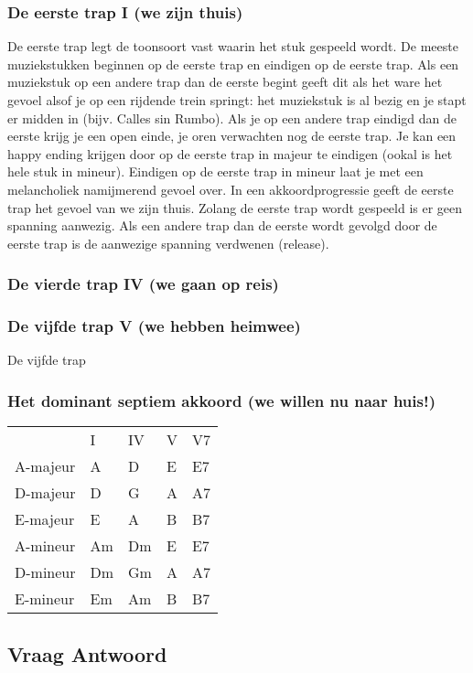 \subsubsection*{De eerste trap I (we zijn thuis)}
De eerste trap legt de toonsoort vast waarin het stuk gespeeld wordt. De meeste muziekstukken beginnen op de eerste trap en eindigen op de eerste trap. Als een muziekstuk op een andere trap dan de eerste begint geeft dit als het ware het gevoel alsof je op een rijdende trein springt: het muziekstuk is al bezig en je stapt er midden in (bijv. Calles sin Rumbo). Als je op een andere trap eindigd dan de eerste krijg je een open einde, je oren verwachten nog de eerste trap. Je kan een happy ending krijgen door op de eerste trap in majeur te eindigen (ookal is het hele stuk in mineur). Eindigen op de eerste trap in mineur laat je met een melancholiek namijmerend gevoel over.
In een akkoordprogressie geeft de eerste trap het gevoel van we zijn thuis. Zolang de eerste trap wordt gespeeld is er geen spanning aanwezig. Als een andere trap dan de eerste wordt gevolgd door de eerste trap is de aanwezige spanning verdwenen (release).
 
\subsubsection*{De vierde trap IV (we gaan op reis)}

\subsubsection*{De vijfde trap V (we hebben heimwee)}
De vijfde trap
\subsubsection*{Het dominant septiem akkoord (we willen nu naar huis!)}

\begin{tabular}{l l l l l}
		 & I & IV & V & V7\\
A-majeur &	A &	D &	E & E7\\
D-majeur &	D &	G &	A & A7\\
E-majeur &	E &	A &	B & B7\\
A-mineur &	Am & Dm & E & E7\\
D-mineur &	Dm & Gm & A	& A7\\
E-mineur &	Em & Am & B	& B7
\end{tabular}

\subsection*{Vraag Antwoord}
